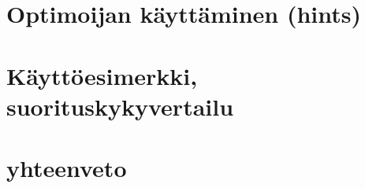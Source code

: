 \documentclass[finnish]{tktltiki2}
\theoremstyle{definition}
\theoremstyle{remark}
\begin{document}
\section{Optimoijan käyttäminen (hints)}
\section{Käyttöesimerkki, suorituskykyvertailu}
\section{yhteenveto}



%
%
% 
%

%


\end{document}
